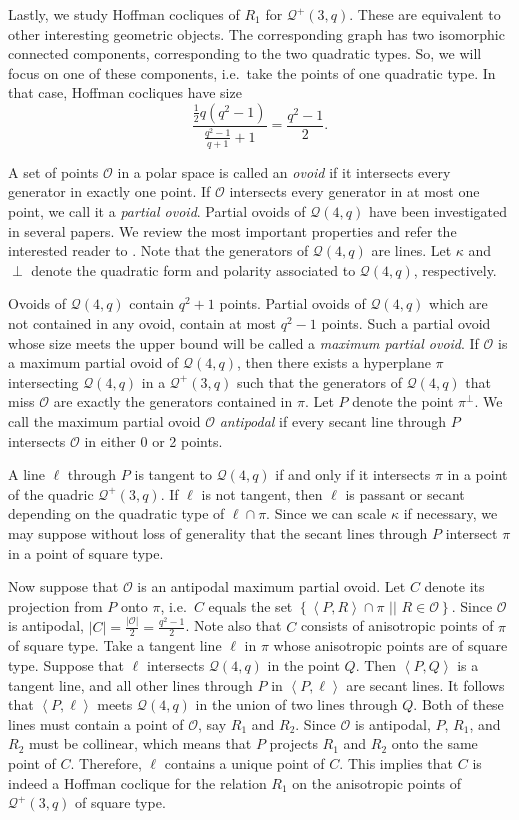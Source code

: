 \documentclass[a4paper]{article}
\theoremstyle{definition}
\newcommand{\vspan}[1]{\left \langle #1 \right \rangle}
\newcommand{\sett}[2]{ \left\{ #1 \, \, || \, \, #2 \right \} }
\newcommand{\mq}{\mathcal Q}
\newcommand{\mo}{\mathcal O}
\begin{document}
Lastly, we study Hoffman cocliques of $R_1$ for $\mq^+(3,q)$.
These are equivalent to other interesting geometric objects.
The corresponding graph has two isomorphic connected components, corresponding to the two quadratic types.
So, we will focus on one of these components, i.e.\ take the points of one quadratic type.
In that case, Hoffman cocliques have size 
\[
 \frac{\frac 12 q(q^2-1)}{\frac{q^2-1}{q+1}+1} = \frac{q^2-1}{2}.
\]

A set of points $\mo$ in a polar space is called an \emph{ovoid} if it intersects every generator in exactly one point.
If $\mo$ intersects every generator in at most one point, we call it a \emph{partial ovoid}.
Partial ovoids of $\mq(4,q)$ have been investigated in several papers.
We review the most important properties and refer the interested reader to \cite{CoolsaetDeBeuleSiciliano}.
Note that the generators of $\mq(4,q)$ are lines.
Let $\kappa$ and $\perp$ denote the quadratic form and polarity associated to $\mq(4,q)$, respectively.

Ovoids of $\mq(4,q)$ contain $q^2+1$ points.
Partial ovoids of $\mq(4,q)$ which are not contained in any ovoid, contain at most $q^2-1$ points.
Such a partial ovoid whose size meets the upper bound will be called a \emph{maximum partial ovoid}.
If $\mo$ is a maximum partial ovoid of $\mq(4,q)$, then there exists a hyperplane $\pi$ intersecting $\mq(4,q)$ in a $\mq^+(3,q)$ such that the generators of $\mq(4,q)$ that miss $\mo$ are exactly the generators contained in $\pi$.
Let $P$ denote the point $\pi^\perp$.
We call the maximum partial ovoid $\mo$ \emph{antipodal} if every secant line through $P$ intersects $\mo$ in either 0 or 2 points.

A line $\ell$ through $P$ is tangent to $\mq(4,q)$ if and only if it intersects $\pi$ in a point of the quadric $\mq^+(3,q)$.
If $\ell$ is not tangent, then $\ell$ is passant or secant depending on the quadratic type of $\ell \cap \pi$.
Since we can scale $\kappa$ if necessary, we may suppose without loss of generality that the secant lines through $P$ intersect $\pi$ in a point of square type.

Now suppose that $\mo$ is an antipodal maximum partial ovoid.
Let $C$ denote its projection from $P$ onto $\pi$, i.e.\ $C$ equals the set $\sett{ \vspan{P,R} \cap \pi }{R \in \mo}$.
Since $\mo$ is antipodal, $|C| = \frac{|\mo|}2 = \frac{q^2-1}{2}$.
Note also that $C$ consists of anisotropic points of $\pi$ of square type.
Take a tangent line $\ell$ in $\pi$ whose anisotropic points are of square type.
Suppose that $\ell$ intersects $\mq(4,q)$ in the point $Q$.
Then $\vspan{P,Q}$ is a tangent line, and all other lines through $P$ in $\vspan{P,\ell}$ are secant lines.
It follows that $\vspan{P,\ell}$ meets $\mq(4,q)$ in the union of two lines through $Q$.
Both of these lines must contain a point of $\mo$, say $R_1$ and $R_2$.
Since $\mo$ is antipodal, $P$, $R_1$, and $R_2$ must be collinear, which means that $P$ projects $R_1$ and $R_2$ onto the same point of $C$.
Therefore, $\ell$ contains a unique point of $C$.
This implies that $C$ is indeed a Hoffman coclique for the relation $R_1$ on the anisotropic points of $\mq^+(3,q)$ of square type.
\end{document}
